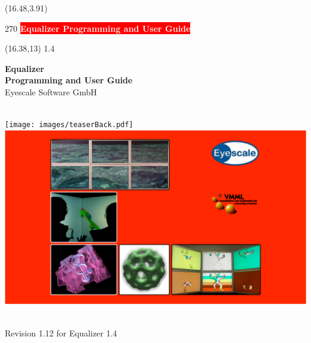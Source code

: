 \documentclass[10pt]{scrartcl}
\newcommand{\boxwidth}{5in}
\newcommand{\spacewidth}{621pt}
\newcommand{\spinewidth}{19.602pt} %
\begin{document}
\thispagestyle{empty}

\begin{textblock}{}(16.48,3.91)
  \begin{rotate}{270}
    \setlength{\fboxsep}{31.7pt} 
    \colorbox{red}{\textsf{\bfseries\large\textcolor{white}{{\hspace{38pt}Equalizer
            Programming and User Guide\hspace{38pt}}}}}
  \end{rotate}
\end{textblock}

\begin{textblock}{}(16.38,13)
  {1.4}
\end{textblock}

\parbox[t]{\spacewidth}{\hfill}
\parbox[t]{\boxwidth}{
\vspace{-32pt}
  \center
  \textsf{\textbf{\huge Equalizer\\Programming and User Guide}}\\[\bigskipamount]
  {\Large Eyescale Software GmbH}\\
}\\
\vfill
\vspace{32pt}
\hspace{-128pt}
  \texttt{[image: images/teaserBack.pdf]}
  \hspace{\spinewidth}
  \includegraphics[width=\spacewidth]{images/teaser.pdf}
\\
\vfill
\parbox[t]{\spacewidth}{\hfill}
\parbox[t]{\boxwidth}{ \\\vspace{1cm}
  {\Large Revision 1.12 for Equalizer 1.4}\\[\medskipamount]
}
\end{document}

